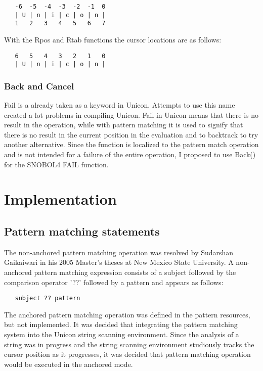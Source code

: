 \documentclass{article}
\begin{document}
\begin{verbatim}
   -6  -5  -4  -3  -2  -1  0
   | U | n | i | c | o | n |
   1   2   3   4   5   6   7
\end{verbatim}

With the Rpos and Rtab functions the cursor locations are as follows:

\begin{verbatim}
   6   5   4   3   2   1   0
   | U | n | i | c | o | n |
\end{verbatim}

\vspace{2 pc}
\subsubsection{Back and Cancel}
Fail is a already taken as a keyword in Unicon.  Attempts to use this name created a lot problems in compiling Unicon.  Fail in Unicon means that there is no result in the operation, while with pattern matching it is used to signify that there is no result in the current position in the evaluation and to backtrack to try another alternative.  Since the function is localized to the pattern match operation and is not intended for a failure of the entire operation, I proposed to use Back() for the SNOBOL4 FAIL function.

\section{Implementation}

\subsection{Pattern matching statements}
The non-anchored pattern matching operation was resolved by Sudarshan Gaikaiwari in his 2005 Master's theses at New Mexico State University.  A non-anchored pattern matching expression consists of a subject followed by the comparison operator '??' followed by a pattern and appears as follows:

\begin{verbatim}
   subject ?? pattern
\end{verbatim}

The anchored pattern matching operation was defined in the pattern resources, but not implemented.  It was decided that integrating the pattern matching system into the Unicon string scanning environment.  Since the analysis of a string was in progress and the string scanning environment studiously tracks the cursor position as it progresses, it was decided that pattern matching operation would be executed in the anchored mode.
\end{document}
